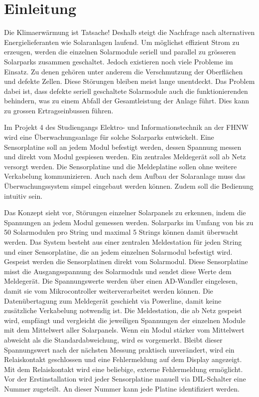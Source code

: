 \section{Einleitung}


Die Klimaerwärmung ist Tatsache! Deshalb steigt die Nachfrage nach alternativen Energielieferanten wie Solaranlagen laufend. Um möglichst effizient Strom zu erzeugen, werden die einzelnen Solarmodule seriell und parallel zu grösseren Solarparks zusammen geschaltet. Jedoch existieren noch viele Probleme im Einsatz. Zu denen gehören unter anderem die Verschmutzung der Oberflächen und defekte Zellen. Diese Störungen bleiben meist lange unentdeckt. Das Problem dabei ist, dass defekte seriell geschaltete Solarmodule auch die funktionierenden behindern, was zu einem Abfall der Gesamtleistung der Anlage führt. Dies kann zu grossen Ertragseinbussen führen.


Im Projekt 4 des Studiengangs Elektro- und Informationstechnik an der FHNW wird eine Überwachungsanlage für solche Solarparks entwickelt. Eine Sensorplatine soll an jedem Modul befestigt werden, dessen Spannung messen und direkt vom Modul gespiesen werden. Ein zentrales Meldegerät soll ab Netz versorgt werden. Die Sensorplatine und die Meldeplatine sollen ohne weitere Verkabelung kommunizieren. Auch nach dem Aufbau der Solaranlage muss das Überwachungssystem simpel eingebaut werden können. Zudem soll die Bedienung intuitiv sein.

Das Konzept sieht vor, Störungen einzelner Solarpanels zu erkennen, indem die Spannungen an jedem Modul gemessen werden. Solarparks im Umfang von bis zu 50 Solarmodulen pro String und maximal 5 Strings können damit überwacht werden. Das System besteht aus einer zentralen Meldestation für jeden String und einer Sensorplatine, die an jedem einzelnen Solarmodul befestigt wird. Gespeist werden die Sensorplatinen direkt vom Solarmodul. Diese Sensorplatine misst die Ausgangsspannung des Solarmoduls und sendet diese Werte dem Meldegerät. Die Spannungswerte werden über einen AD-Wandler eingelesen, damit sie vom Mikrocontroller weiterverarbeitet werden können. Die Datenübertagung zum Meldegerät geschieht via Powerline, damit keine zusätzliche Verkabelung notwendig ist. Die Meldestation, die ab Netz gespeist wird, empfängt und vergleicht die jeweiligen Spannungen der einzelnen Module mit dem Mittelwert aller Solarpanels. Wenn ein Modul stärker vom Mittelwert abweicht als die Standardabweichung, wird es vorgemerkt. Bleibt dieser Spannungswert nach der nächsten Messung praktisch unverändert, wird ein Relaiskontakt geschlossen und eine Fehlermeldung auf dem Display angezeigt. Mit dem Relaiskontakt wird eine beliebige, externe Fehlermeldung ermöglicht. Vor der Erstinstallation wird jeder Sensorplatine manuell via DIL-Schalter eine Nummer zugeteilt. An dieser Nummer kann jede Platine identifiziert werden.

